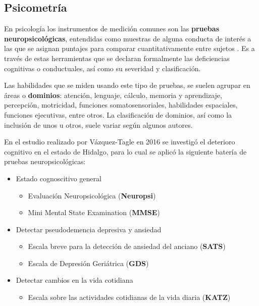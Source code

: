 
\subsection{Psicometría}

En psicología los instrumentos de medición comunes son las \textbf{pruebas neuropsicológicas}, 
entendidas como muestras de alguna conducta de interés a las que se asignan puntajes para comparar 
cuantitativamente entre sujetos \cite{Ardila12}.
%
Es a través de estas herramientas que se declaran formalmente las deficiencias cognitivas o 
conductuales, así como su severidad y clasificación.

Las habilidades que se miden usando este tipo de pruebas, se suelen agrupar en áreas o 
\textbf{dominios}: atención, lenguaje, cálculo, memoria y aprendizaje, percepción, motricidad, 
funciones somatosensoriales, habilidades espaciales, funciones ejecutivas, entre otros. 
La clasificación de dominios, así como la inclusión de unos u otros, suele
variar según algunos autores.
%
%

En el estudio realizado por Vázquez-Tagle en 2016 \cite{VazquezTagle16} se investigó el deterioro
cognitivo en el estado de Hidalgo, para lo cual se aplicó la siguiente batería de pruebas
neuropsicológicas:
\begin{itemize}
\item Estado cognoscitivo general
\begin{itemize}
\item {Evaluación Neuropsicológica (\textbf{Neuropsi})} \cite{Solis03}
\item {Mini Mental State Examination (\textbf{MMSE})} \cite{Velasco15}
\end{itemize}
\item Detectar pseudodemencia depresiva y ansiedad
\begin{itemize}
\item {Escala breve para la detección de ansiedad del anciano (\textbf{SATS})} \cite{Vargas11}
\item {Escala de Depresión Geriátrica (\textbf{GDS})} \cite{Yesavage82,Greenberg12}
\end{itemize}
\item Detectar cambios en la vida cotidiana
\begin{itemize}
\item {Escala sobre las actividades cotidianas de la vida diaria (\textbf{KATZ})} \cite{Roumec14}
\end{itemize}
\end{itemize}

